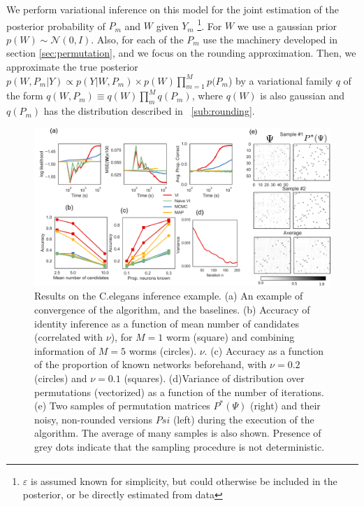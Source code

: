\documentclass[twoside]{article}
\begin{document}
We perform variational inference on this model for the joint estimation of the posterior probability of $P_m$ and $W$ given  $Y_m$ \footnote{$\varepsilon$ is assumed known for simplicity, but could otherwise be included in the posterior, or be directly estimated from data}. For $W$ we use a gaussian prior $p(W)\sim \mathcal{N}(0, I)$. Also, for each of the $P_m$ use the machinery developed in section \ref{sec:permutation}, and we focus on the rounding approximation. 
Then, we approximate the true posterior $p(W,P_m|Y)\propto p(Y|W,P_m)\times p(W)\prod_{m=1}^M p(P_m$)  by a variational family $q$ of the form $q(W,P_m)\equiv q(W)\prod_m^M q(P_m)$, where $q(W)$ is also gaussian and $q(P_m)$ has the distribution described in ~\ref{sub:rounding}. 


\begin{figure}[ht]
  \centering
  \includegraphics[width=1.0\textwidth]{../figures/figure7.pdf} 
  \caption{Results on the C.elegans inference example. (a) An example of convergence of the algorithm, and the baselines. (b) Accuracy of identity inference as a function of mean number of candidates (correlated with $\nu$), for $M=1$ worm (square) and combining information of $M=5$ worms (circles). $\nu$. (c) Accuracy as a function of the proportion of known networks beforehand,  with $\nu=0.2$ (circles) and $\nu=0.1$ (squares). (d)Variance of distribution over permutations (vectorized) as a function of the number of iterations. (e) Two samples of permutation matrices $P^*(\Psi)$ (right) and their noisy, non-rounded versions $Psi$ (left) during the execution of the algorithm. The average of many samples is also shown. Presence of grey dots indicate that the sampling procedure is not deterministic.}
\label{fig:elegantresults}
\end{figure}
\end{document}
